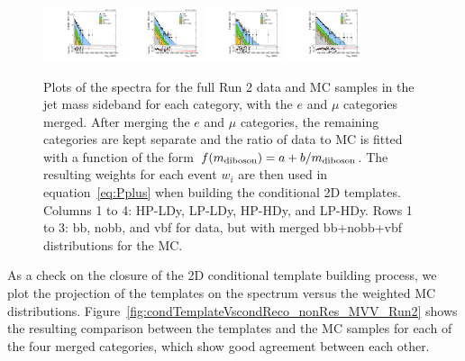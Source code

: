 \begin{figure}[htbp]
  \includegraphics[width=0.2\textwidth]{fig/analysis/slopesSB_b1_allL_HP_vbf_LDy_Run2_mWV_1OverX.pdf}
  \includegraphics[width=0.2\textwidth]{fig/analysis/slopesSB_b1_allL_LP_vbf_LDy_Run2_mWV_1OverX.pdf}
  \includegraphics[width=0.2\textwidth]{fig/analysis/slopesSB_b1_allL_HP_vbf_HDy_Run2_mWV_1OverX.pdf}
  \includegraphics[width=0.2\textwidth]{fig/analysis/slopesSB_b1_allL_LP_vbf_HDy_Run2_mWV_1OverX.pdf}\\
  \caption{
    Plots of the \MVV spectra for the full Run 2 data and MC samples in the jet mass sideband for each category, with the $e$ and $\mu$ categories merged.
    After merging the $e$ and $\mu$ categories, the remaining categories are kept separate and the ratio of data to MC is fitted with a function of the form $f(m_\mathrm{diboson})=a+b/m_\mathrm{diboson}$.
    The resulting weights for each event $w_i$ are then used in equation~\ref{eq:Pplus} when building the conditional 2D templates.
    Columns 1 to 4: HP-LDy, LP-LDy, HP-HDy, and LP-HDy.
    Rows 1 to 3: bb, nobb, and vbf for data, but with merged bb+nobb+vbf distributions for the MC.
  }
  \label{fig:nonResMvvSpectrumReweighting}
\end{figure}

As a check on the closure of the 2D conditional template building process, we plot the projection of the templates on the \MVV spectrum versus the weighted MC distributions.
Figure~\ref{fig:condTemplateVscondReco_nonRes_MVV_Run2} shows the resulting comparison between the templates and the MC samples for each of the four merged categories, which show good agreement between each other.

